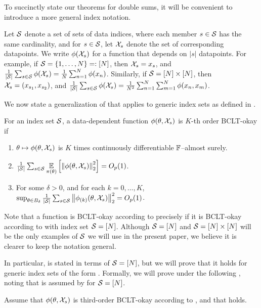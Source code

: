 

To succinctly state our theorems for double sums, it will be convenient to
introduce a more general index notation.

\begin{defn}
    Let $\mathcal{S}$ denote a set of sets of data indices, where each member $s \in
    \mathcal{S}$ has the same cardinality, and for $s \in \mathcal{S}$, let ${\mathcal{X}}_s$
    denote the set of corresponding datapoints.  We write $\phi({\mathcal{X}}_s)$ for a
    function that depends on $|s|$ datapoints.  For example, if $\mathcal{S} = \{1,
    \ldots, N \} =: [N]$, then ${\mathcal{X}}_s = x_s$, and $\frac{1}{|\mathcal{S}|}\sum_{s \in \mathcal{S}} \phi({\mathcal{X}}_s) = \frac{1}{N}\sum_{n=1}^N
    \phi(x_n)$.  Similarly, if $\mathcal{S} = [N] \times [N]$, then ${\mathcal{X}}_s =
    (x_{s_1}, x_{s_2})$, and $\frac{1}{|\mathcal{S}|}\sum_{s \in \mathcal{S}} \phi({\mathcal{X}}_s) = \frac{1}{N^2} \sum_{n=1}^N
    \sum_{m=1}^N \phi(x_n, x_m)$.
\end{defn}

We now state a generalization of  that applies to 
generic index sets as defined in .

\begin{defn}
%
For an index set $\mathcal{S}$, a data-dependent function
$\phi(\theta, {\mathcal{X}}_s)$ is $K$-th order BCLT-okay if
%
\begin{enumerate}
%
\item{}
    $\theta \mapsto \phi(\theta, {\mathcal{X}}_s)$
    is $K$ times continuously differentiable $\mathbb{F}$--almost surely.
%
\item{}
    $\frac{1}{|\mathcal{S}|}\sum_{s \in \mathcal{S}} \underset{\pi(\theta)}{\mathbb{E}}\left[\left\Vert \phi(\theta, {\mathcal{X}}_s)\right\Vert^2_2\right] = O_p(1)$.
%
\item{}
For some $\delta > 0$, and for each $k = 0, \ldots, K$,
$\sup_{\theta \in B_{\delta}}
    \frac{1}{|\mathcal{S}|}\sum_{s \in \mathcal{S}} \left\Vert \phi_{(k)}(\theta, {\mathcal{X}}_s)\right\Vert^2_2 = O_p(1)$.
%
\end{enumerate}
%
\end{defn}


Note that a function is BCLT-okay according to  precisely if
it is BCLT-okay according to  with index set $\mathcal{S}
= [N]$.  Although $\mathcal{S} = [N]$ and $\mathcal{S} = [N]\times[N]$ will be the
only examples of $\mathcal{S}$ we will use in the present paper, we believe it is
clearer to keep the notation general.   

In particular,  is stated in terms of $\mathcal{S} = [N]$,
but we will prove that it holds for generic index sets of the form
.  Formally, we will prove  under
the following , noting that  is
assumed by  for $\mathcal{S} = [N]$.

\begin{assu}
%
Assume that $\phi(\theta, {\mathcal{X}}_s)$ is third-order BCLT-okay
according to , and that  holds.
%
\end{assu}

